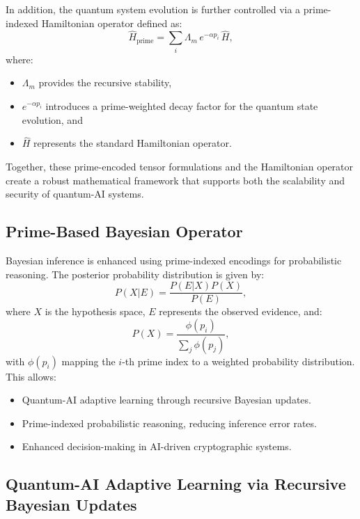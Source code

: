 \documentclass{article}
\theoremstyle{plain}
\begin{document}
\begin{itemize}
In addition, the quantum system evolution is further controlled via a prime-indexed Hamiltonian operator defined as:
\begin{equation}
\hat{H}_{\text{prime}} = \sum_{i} \Lambda_m \, e^{-\alpha p_i} \, \hat{H},
\end{equation}
where:
\begin{itemize}
    \item \(\Lambda_m\) provides the recursive stability,
    \item \(e^{-\alpha p_i}\) introduces a prime-weighted decay factor for the quantum state evolution, and
    \item \(\hat{H}\) represents the standard Hamiltonian operator.
\end{itemize}

Together, these prime-encoded tensor formulations and the Hamiltonian operator create a robust mathematical framework that supports both the scalability and security of quantum-AI systems.

\subsection{Prime-Based Bayesian Operator}

Bayesian inference is enhanced using prime-indexed encodings for probabilistic reasoning. The posterior probability distribution is given by:
\begin{equation}
P(X | E) = \frac{P(E | X) P(X)}{P(E)},
\end{equation}
where $X$ is the hypothesis space, $E$ represents the observed evidence, and:
\begin{equation}
P(X) = \frac{\phi(p_i)}{\sum_{j} \phi(p_j)},
\end{equation}
with $\phi(p_i)$ mapping the $i$-th prime index to a weighted probability distribution. This allows:
\begin{itemize}
    \item Quantum-AI adaptive learning through recursive Bayesian updates.
    \item Prime-indexed probabilistic reasoning, reducing inference error rates.
    \item Enhanced decision-making in AI-driven cryptographic systems.
\end{itemize}
\subsection{Quantum-AI Adaptive Learning via Recursive Bayesian Updates}


\end{itemize}
\end{document}
